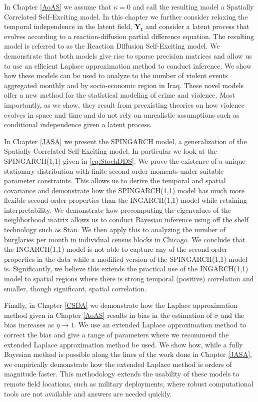 \documentclass[11pt]{isuthesis}
\begin{document}
	In Chapter \ref{AoAS} we assume that $\kappa=0$ and call the resulting model a Spatially Correlated Self-Exciting model.  In this chapter we further consider relaxing the temporal independence in the latent field, $\boldsymbol{Y_t}$ and consider a latent process that evolves according to a reaction-diffusion partial difference equation.  The resulting model is referred to as the Reaction Diffusion Self-Exciting model.  We demonstrate that both models give rise to sparse precision matrices and allow us to use an efficient Laplace approximation method to conduct inference.  We show how these models can be used to analyze to the number of violent events aggregated monthly and by socio-economic region in Iraq.  These novel models offer a new method for the statistical modeling of crime and violence.  Most importantly, as we show, they result from preexisting theories on how violence evolves in space and time and do not rely on unrealistic assumptions such as conditional independence given a latent process.
	
	In Chapter \ref{JASA} we present the SPINGARCH model, a generalization of the Spatially Correlated Self-Exciting model.  In particular we look at the SPINGARCH(1,1) given in \eqref{eq:StochDDS}.  We prove the existence of a unique stationary distribution with finite second order moments under suitable parameter constraints.  This allows us to derive the temporal and spatial covariance and demonstrate how the SPINGARCH(1,1) model has much more flexible second order properties than the INGARCH(1,1) model while retaining interpretability.  We demonstrate how precomputing the eigenvalues of the neighborhood matrix allows us to conduct Bayesian inference using off the shelf technology such as Stan.  We then apply this to analyzing the number of burglaries per month in individual census blocks in Chicago.  We conclude that the INGARCH(1,1) model is not able to capture any of the second order properties in the data while a modified version of the SPINGARCH(1,1) model is.  Significantly, we believe this extends the practical use of the INGARCH(1,1) model to spatial regions where there is strong temporal (positive) correlation and smaller, though significant, spatial correlation.  
	
	Finally, in Chapter \ref{CSDA} we demonstrate how the Laplace approximation method given in Chapter \ref{AoAS} results in bias in the estimation of $\sigma$ and the bias increases as $\eta \to 1$.  We use an extended Laplace approximation method to correct the bias and give a range of parameters where we recommend the extended Laplace approximation method be used.  We show how, while a fully Bayesian method is possible along the lines of the work done in Chapter \ref{JASA}, we empirically demonstrate how the extended Laplace method is orders of magnitude faster.  This methodology extends the usability of these models to remote field locations, such as military deployments, where robust computational tools are not available and answers are needed quickly.
	
\end{document}
